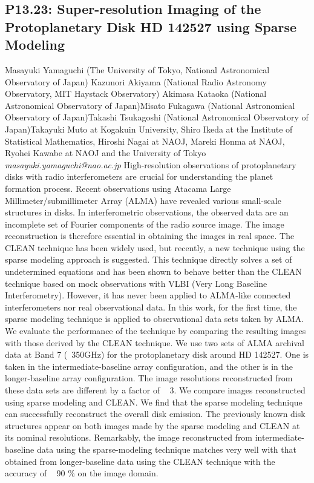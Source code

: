 \documentclass{report}
\begin{document}
\subsection*{P13.23: Super-resolution Imaging of the Protoplanetary Disk HD 142527 using Sparse Modeling}
\bigskip
Masayuki Yamaguchi (The University of Tokyo, National Astronomical Observatory of Japan) \newline Kazunori Akiyama (National Radio Astronomy Observatory, MIT Haystack Observatory) \newline  Akimasa Kataoka (National Astronomical Observatory of Japan)\newline  Misato Fukagawa (National Astronomical Observatory of Japan)\newline Takashi Tsukagoshi (National Astronomical Observatory of Japan)\newline  Takayuki Muto at Kogakuin University, Shiro Ikeda at the Institute of Statistical Mathematics, Hiroshi Nagai at NAOJ, Mareki Honma at NAOJ, Ryohei Kawabe at NAOJ and the University of Tokyo\newline\newline
{\it masayuki.yamaguchi@nao.ac.jp}\newline
\newline\newline
High-resolution observations of protoplanetary disks with radio interferometers are crucial for understanding the planet formation process. Recent observations using Atacama Large Millimeter/submillimeter Array (ALMA) have revealed various small-scale structures in disks. In interferometric observations, the observed data are an incomplete set of Fourier components of the radio source image. The image reconstruction is therefore essential in obtaining the images in real space. The CLEAN technique has been widely used, but recently, a new technique using the sparse modeling approach is suggested. This technique directly solves a set of undetermined equations and has been shown to behave better than the CLEAN technique based on mock observations with VLBI (Very Long Baseline Interferometry). However, it has never been applied to ALMA-like connected interferometers nor real observational data. In this work, for the first time, the sparse modeling technique is applied to observational data sets taken by ALMA. We evaluate the performance of the technique by comparing the resulting images with those derived by the CLEAN technique. We use two sets of ALMA archival data at Band 7 (~350GHz) for the protoplanetary disk around HD 142527. One is taken in the intermediate-baseline array configuration, and the other is in the longer-baseline array configuration. The image resolutions reconstructed from these data sets are different by a factor of ~ 3. We compare images reconstructed using sparse modeling and CLEAN. We find that the sparse modeling technique can successfully reconstruct the overall disk emission. The previously known disk structures appear on both images made by the sparse modeling and CLEAN at its nominal resolutions. Remarkably, the image reconstructed from intermediate-baseline data using the sparse-modeling technique matches very well with that obtained from longer-baseline data using the CLEAN technique with the accuracy of ~ 90 \% on the image domain.\newline
\newpage
\end{document}
